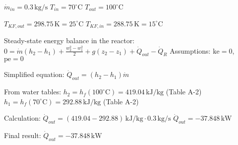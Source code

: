 \( \dot{m}_{in} = 0.3 \, \text{kg/s} \)  
\( T_{in} = 70^\circ \text{C} \)  
\( T_{out} = 100^\circ \text{C} \)  

\( T_{KF,out} = 298.75 \, \text{K} = 25^\circ \text{C} \)  
\( T_{KF,in} = 288.75 \, \text{K} = 15^\circ \text{C} \)  

Steady-state energy balance in the reactor:  
\( 0 = \dot{m} (h_2 - h_1) + \frac{w_2^2 - w_1^2}{2} + g(z_2 - z_1) + \dot{Q}_{out} - \dot{Q}_R \)  
Assumptions: \( \text{ke} = 0 \), \( \text{pe} = 0 \)  

Simplified equation:  
\( \dot{Q}_{out} = (h_2 - h_1) \dot{m} \)  

From water tables:  
\( h_2 = h_f(100^\circ \text{C}) = 419.04 \, \text{kJ/kg} \) (Table A-2)  
\( h_1 = h_f(70^\circ \text{C}) = 292.88 \, \text{kJ/kg} \) (Table A-2)  

Calculation:  
\( \dot{Q}_{out} = (419.04 - 292.88) \, \text{kJ/kg} \cdot 0.3 \, \text{kg/s} \)  
\( \dot{Q}_{out} = -37.848 \, \text{kW} \)  

Final result:  
\( \dot{Q}_{out} = -37.848 \, \text{kW} \)